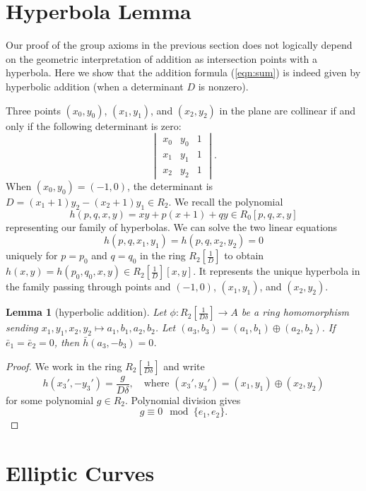 \documentclass[12pt]{article}
\newtheorem{lemma}[theorem]{Lemma}
\newcommand{\f}[1]{\frac{1}{#1}}
\def\cong{\equiv}
\begin{document}
\section{Hyperbola Lemma}

Our proof of the group axioms in the previous section does not
logically depend on the geometric interpretation of addition as
intersection points with a hyperbola.  Here we show that the addition
formula (\ref{eqn:sum}) is indeed given by hyperbolic addition (when a
determinant $D$ is nonzero).

Three points $(x_0,y_0)$, $(x_1,y_1)$, and $(x_2,y_2)$ in the plane
are collinear if and only if the following determinant is zero:
\[
\begin{vmatrix}
x_0 & y_0 & 1\\
x_1 & y_1 & 1\\
x_2 & y_2 & 1
\end{vmatrix}.
\]
When $(x_0,y_0) = (-1,0)$, the determinant
is $D= (x_1+1) y_2 - (x_2+1) y_1\in R_2$. 
We recall the polynomial
\[
h(p,q,x,y) = x y + p (x+1) + q y \in R_0[p,q,x,y]
\]
representing our family of hyperbolas.
We can solve the two linear equations
\[
h(p,q,x_1,y_1)=h(p,q,x_2,y_2)=0
\]
uniquely for $p=p_0$ and $q=q_0$ in the ring $R_2[\f{D}]$ to obtain
$h(x,y) = h(p_0,q_0,x,y) \in R_2[\f{D}][x,y]$.  It represents the
unique hyperbola in the family passing through points and $(-1,0)$,
$(x_1,y_1)$, and $(x_2,y_2)$.
 
\begin{lemma}[hyperbolic addition]\label{lemma:hyperbola}
  Let $\phi:R_2[\f{D\delta}]\to A$ be a ring homomorphism sending
  $x_1,y_1,x_2,y_2\mapsto a_1,b_1,a_2,b_2$.  Let $(a_3,b_3) =
  (a_1,b_1)\oplus (a_2,b_2)$.  If $\bar e_1 = \bar e_2 = 0$, then
  $\bar h(a_3,-b_3) = 0$.
\end{lemma}

\begin{proof}
  We work in the ring $R_2[\f{D\delta}]$ and write
\[
h(x_3',-y_3') = \frac{g}{D\delta},\quad 
\text{where } (x_3',y_3') = (x_1,y_1)\oplus (x_2,y_2)
\]
for some polynomial $g \in R_2$.  Polynomial division gives
\begin{equation}\label{eqn:h}
g \cong 0 \mod \{e_1,e_2\}.
\end{equation}
\end{proof}

\section{Elliptic Curves}\label{sec:elliptic}
\end{document}
